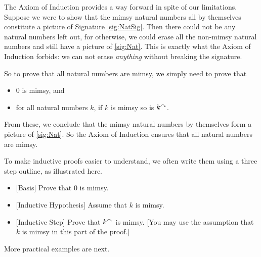 The Axiom of Induction provides a way forward in spite of our
limitations.  Suppose we were to show that the mimsy natural numbers
all by themselves constitute a picture of Signature
\ref{sig:NatSig}.  Then there could not be any natural numbers
left out, for otherwise, we could erase all the non-mimsy natural
numbers and still have a picture of \ref{sig:Nat}. This
is exactly what the Axiom of Induction forbids: we can not erase
\emph{anything} without breaking the signature.

So to prove that all natural numbers are mimsy, we simply need to
prove that
\begin{itemize}
\item $0$ is mimsy, and
\item for all natural numbers $k$, if $k$ is mimsy so is $k^\curvearrowright$.
\end{itemize}
From these, we conclude that the mimsy natural numbers by themselves form a picture of \ref{sig:Nat}. So the Axiom of Induction ensures that all natural numbers
are mimsy.


To make inductive proofs easier to understand, we often write them
using a three step outline, as illustrated here.
\begin{itemize}
\item{}[Basis] Prove that $0$ is mimsy.
\item{}[Inductive Hypothesis] Assume that $k$ is mimsy.
\item{}[Inductive Step] Prove that $k^\curvearrowright$ is mimsy. [You may use the
  assumption that $k$ is mimsy in this part of the proof.]
\end{itemize}

More practical examples are next.

\ipadbreak

